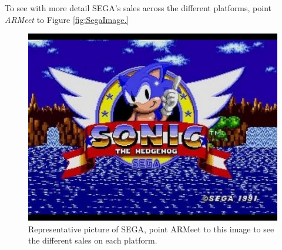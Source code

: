 To see with more detail SEGA's sales across the different platforms, point
\textit{ARMeet} to Figure \ref{fig:SegaImage.}\\

\begin{figure}[h]
  \centering
  \centerline{\includegraphics[scale=0.8]{images/SegaMainTarget.png}}
  \caption{Representative picture of SEGA, point ARMeet to this image to
    see the different sales on each platform.}
  \label{fig:SegaImage}
\end{figure}





